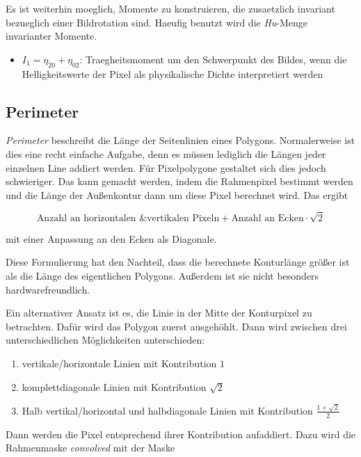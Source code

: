 Es ist weiterhin moeglich, Momente zu konstruieren, die zusaetzlich invariant bezueglich einer Bildrotation sind.
Haeufig benutzt wird die \emph{Hu}-Menge invarianter Momente.

\begin{itemize}
  \item $I_1 = \eta_{20} + \eta_{02}$: Traegheitsmoment um den Schwerpunkt des Bildes, wenn die Helligkeitswerte der Pixel als physikalische Dichte interpretiert werden
\end{itemize}

\subsection{Perimeter}

\emph{Perimeter} beschreibt die Länge der Seitenlinien eines Polygons.
Normalerweise ist dies eine recht einfache Aufgabe, denn es müssen lediglich die Längen jeder einzelnen Line addiert werden.
Für Pixelpolygone gestaltet sich dies jedoch schwieriger.
Das kann gemacht werden, indem die Rahmenpixel bestimmt werden und die Länge der Außenkontur dann um diese Pixel berechnet wird.
Das ergibt

\begin{equation}
  \text{Anzahl an horizontalen \& vertikalen Pixeln} + \text{Anzahl an Ecken} \cdot \sqrt{2}
\end{equation}

mit einer Anpassung an den Ecken als Diagonale.

Diese Formulierung hat den Nachteil, dass die berechnete Konturlänge größer ist als die Länge des eigentlichen Polygons.
Außerdem ist sie nicht besonders hardwarefreundlich.

Ein alternativer Ansatz ist es, die Linie in der Mitte der Konturpixel zu betrachten.
Dafür wird das Polygon zuerst ausgehöhlt.
Dann wird zwischen drei unterschiedlichen Möglichkeiten unterschieden:

\begin{enumerate}
  \item vertikale/horizontale Linien mit Kontribution $1$
  \item komplettdiagonale Linien mit Kontribution $\sqrt{2}$
  \item Halb vertikal/horizontal und halbdiagonale Linien mit Kontribution $\frac{1 + \sqrt{2}}{2}$
\end{enumerate}

Dann werden die Pixel entsprechend ihrer Kontribution aufaddiert.
Dazu wird die Rahmenmaske \emph{convolved} mit der Maske

